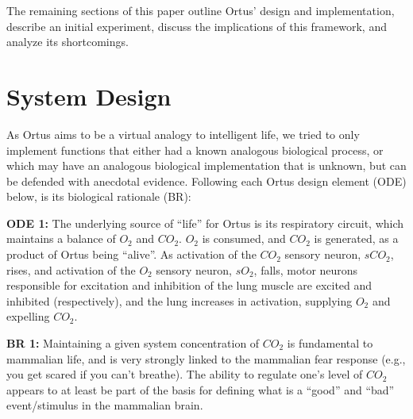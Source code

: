 \documentclass[letterpaper]{article}
\begin{document}
The remaining sections of this paper outline Ortus' design and implementation, describe an initial experiment, discuss the implications of this framework, and analyze its shortcomings.

\section{System Design}


As Ortus aims to be a virtual analogy to intelligent life, we tried to only implement functions that either had a known analogous biological process, or which may have an analogous biological implementation that is unknown, but can be defended with anecdotal evidence. Following each Ortus design element (ODE) below, is its biological rationale (BR):





\textbf{ODE 1:} The underlying source of ``life'' for Ortus is its respiratory circuit, which maintains a balance of $O_2$ and $CO_2$. $O_2$ is consumed, and $CO_2$ is generated, as a product of Ortus being ``alive''. As activation of the $CO_2$ sensory neuron, $sCO_2$, rises, and activation of the $O_2$ sensory neuron, $sO_2$, falls, motor neurons responsible for excitation and inhibition of the lung muscle are excited and inhibited (respectively), and the lung increases in activation, supplying $O_2$ and expelling $CO_2$. 

\textbf{BR 1:} Maintaining a given system concentration of $CO_2$ is fundamental to mammalian life, and is very strongly linked to the mammalian fear response (e.g., you get scared if you can't breathe). The ability to regulate one's level of $CO_2$ appears to at least be part of the basis for defining what is a ``good'' and ``bad'' event/stimulus in the mammalian brain.
\end{document}
